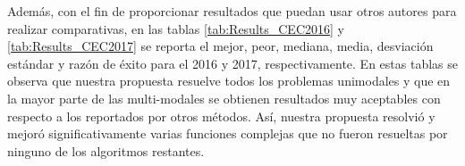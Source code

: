 Además, con el fin de proporcionar resultados que puedan usar otros autores para realizar comparativas, en las tablas \ref{tab:Results_CEC2016} y \ref{tab:Results_CEC2017} 
se reporta el mejor, peor, mediana, media, desviación estándar y razón de éxito para el \CEC{} 2016 y 2017, respectivamente.
%
En estas tablas se observa que nuestra propuesta resuelve todos los problemas unimodales y que en la mayor parte de las multi-modales
se obtienen resultados muy aceptables con respecto a los reportados por otros métodos.
%
%
Así, nuestra propuesta resolvió y mejoró significativamente varias funciones complejas que no fueron resueltas por ninguno de los algoritmos restantes.
%
